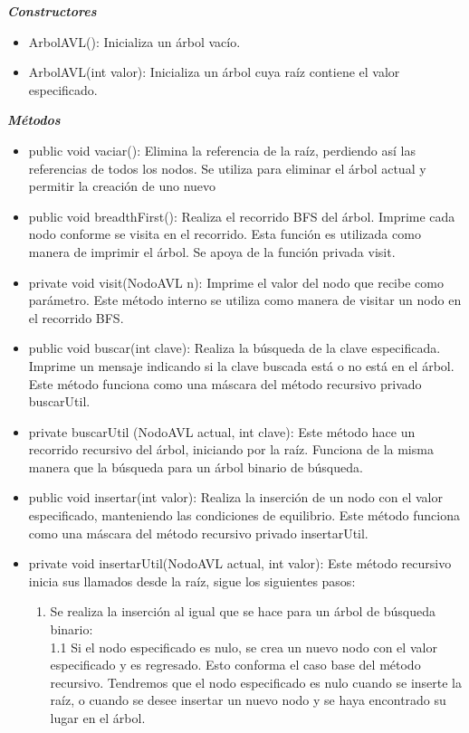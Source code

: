 \documentclass{article}
\begin{document}
\textit{\textbf{Constructores}}
\begin{itemize}
\item ArbolAVL(): Inicializa un árbol vacío.
\item ArbolAVL(int valor): Inicializa un árbol cuya raíz contiene el valor especificado.
\end{itemize}
\textit{\textbf{Métodos}}
\begin{itemize}
\item public void vaciar(): Elimina la referencia de la raíz, perdiendo así las referencias de todos los nodos. Se utiliza para eliminar el árbol actual y permitir la creación de uno nuevo
\item public void breadthFirst(): Realiza el recorrido BFS del árbol. Imprime cada nodo conforme se visita en el recorrido. Esta función es utilizada como manera de imprimir el árbol. Se apoya de la función privada visit.
\item private void visit(NodoAVL n): Imprime el valor del nodo que recibe como parámetro. Este método interno se utiliza como manera de visitar un nodo en el recorrido BFS.
\item public void buscar(int clave): Realiza la búsqueda de la clave especificada. Imprime un mensaje indicando si la clave buscada está o no está en el árbol. Este método funciona como una máscara del método recursivo privado buscarUtil.
\item private buscarUtil (NodoAVL actual, int clave): Este método hace un recorrido recursivo del árbol, iniciando por la raíz. Funciona de la misma manera que la búsqueda para un árbol binario de búsqueda.
\item public void insertar(int valor): Realiza la inserción de un nodo con el valor especificado, manteniendo las condiciones de equilibrio. Este método funciona como una máscara del método recursivo privado insertarUtil. 
\item private void insertarUtil(NodoAVL actual, int valor): Este método recursivo inicia sus llamados desde la raíz, sigue los siguientes pasos:
\begin{enumerate}
\item Se realiza la inserción al igual que se hace para un árbol de búsqueda binario:\\

            1.1 Si el nodo especificado es nulo, se crea un nuevo nodo con el valor especificado y es regresado. Esto conforma el caso base del método recursivo. Tendremos que el nodo especificado es nulo cuando se inserte la raíz, o cuando se desee insertar un nuevo nodo y se haya encontrado su lugar en el árbol. \\
            

\end{enumerate}
\end{itemize}
\end{document}
